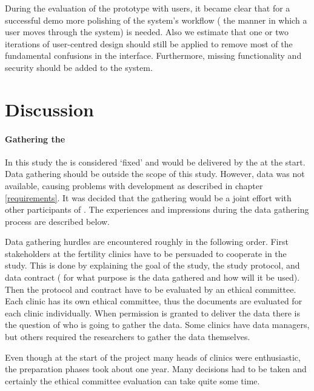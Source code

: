 During the evaluation of the prototype with users, it became clear that for a successful demo more polishing of the system's workflow (\ie{} the manner in which a user moves through the system) is needed.
Also we estimate that one or two iterations of user-centred design should still be applied to remove most of the fundamental confusions in the interface.
Furthermore, missing functionality and security should be added to the system.

\section{Discussion}

\paragraph{Gathering the \projectdata{}}

In this study the \projectdata{} is considered `fixed' and would be delivered by the \project{} at the start.
Data gathering should be outside the scope of this study.
However, data was not available, causing problems with development as described in chapter \ref{requirements}.
It was decided that the gathering would be a joint effort with other participants of \project{}.
The experiences and impressions during the data gathering process are described below.

Data gathering hurdles are encountered roughly in the following order.
First stakeholders at the fertility clinics have to be persuaded to cooperate in the study.
This is done by explaining the goal of the study, the study protocol, and data contract (\ie{} for what purpose is the data gathered and how will it be used).
Then the protocol and contract have to be evaluated by an ethical committee.
Each clinic has its own ethical committee, thus the documents are evaluated for each clinic individually.
When permission is granted to deliver the data there is the question of who is going to gather the data.
Some clinics have data managers, but others required the \project{} researchers to gather the data themselves.

Even though at the start of the project many heads of clinics were enthusiastic, the preparation phases took about one year.
Many decisions had to be taken and certainly the ethical committee evaluation can take quite some time. 

